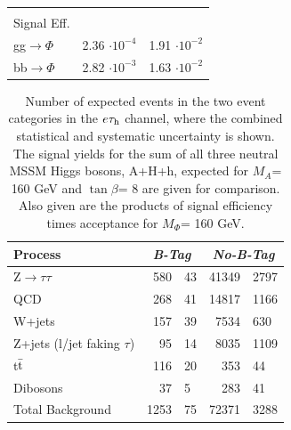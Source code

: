 \begin{table}[!h]
\begin{center}
\begin{tabular}{|l|r@{$ \,\,\pm\,\, $}l|r@{$ \,\,\pm\,\, $}l|}
\hline 
\multicolumn{5}{c}{ } \\
\multicolumn{2}{l}{Signal Eff.} &  \multicolumn{3}{c}{ } \\
\hline
gg$\rightarrow\Phi$                &       \multicolumn{2}{|c|}{2.36 $\cdot 10^{-4}$}      &       \multicolumn{2}{|c|}{1.91 $\cdot 10^{-2}$}\\ 
\hline 
bb$\rightarrow\Phi$                &       \multicolumn{2}{|c|}{2.82 $\cdot 10^{-3}$}      &       \multicolumn{2}{|c|}{1.63 $\cdot 10^{-2}$}\\ 
\hline 
\end{tabular} 
\label{table:events_mutau} 
\end{center} 
\end{table} 

\vspace*{-0.2cm}
\begin{table}[!h]
  \begin{center}
    \caption{Number of expected events in the two event categories in the $e\mathrm{\tau}_{\rm h}$ channel, where the combined statistical and systematic uncertainty is shown. 
      The signal yields for the sum of all three neutral MSSM Higgs bosons, A+H+h, expected for $M_{A}$= 160 GeV and $\tan\beta$= 8 are given for comparison.
      Also given are the products of signal efficiency times acceptance for $M_{\Phi}$= 160 GeV.}
\begin{tabular}{|l|r@{$ \,\,\pm\,\, $}l|r@{$ \,\,\pm\,\, $}l|} 
\hline 
Process & \multicolumn{2}{c|}{\emph{B-Tag}} & \multicolumn{2}{c|}{\emph{No-B-Tag}}\\ 
\hline 
Z$\rightarrow \tau\tau$          &       580     &       43      &       41349   &       2797    \\ 
\hline 
QCD                              &       268     &       41      &       14817   &       1166    \\ 
\hline 
W+jets                           &       157     &       39      &       7534    &       630     \\ 
\hline 
Z+jets (l/jet faking $\tau$)     &       95      &       14      &       8035    &       1109    \\ 
\hline 
t$\bar{\rm{t}}$                  &       116     &       20      &       353     &       44      \\ 
\hline 
Dibosons                         &       37      &       5       &       283     &       41      \\ 
\hline 
\hline 
Total Background                 &       1253    &       75      &       72371   &       3288    \\ 

\end{tabular}
\end{center}
\end{table}
